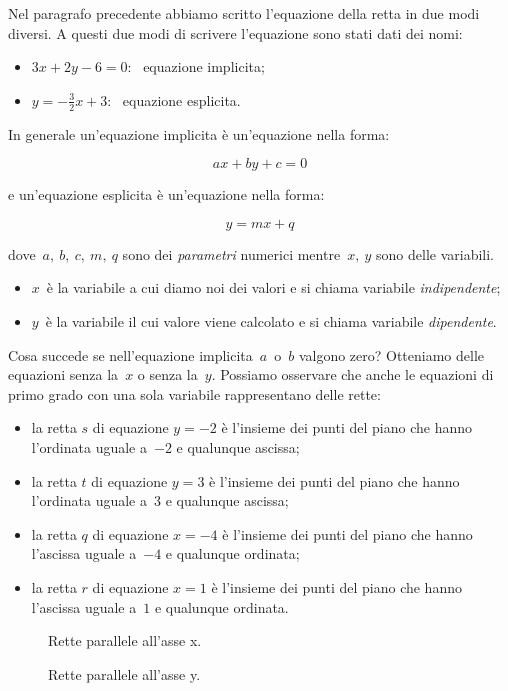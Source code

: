 Nel paragrafo precedente abbiamo scritto l'equazione della retta in due modi 
diversi. A questi due modi di scrivere l'equazione sono stati dati dei nomi:

\begin{itemize}
 \item $3x + 2y - 6 = 0$:~ equazione implicita;
 \item $y = -\frac{3}{2}x +3$:~ equazione esplicita.
\end{itemize}

In generale un'equazione implicita è un'equazione nella forma:

\[ax + by + c = 0\]

e un'equazione esplicita è un'equazione nella forma:

\[y = mx + q\]

dove~$a,~b,~c,~m,~q$ sono dei \emph{parametri} numerici mentre~$x,~y$ sono 
delle variabili.

\begin{itemize}
 \item $x$~è la variabile a cui diamo noi dei valori e si chiama 
  variabile \emph{indipendente};
 \item $y$~è la variabile il cui valore viene calcolato e si chiama 
  variabile \emph{dipendente}.
\end{itemize}

Cosa succede se nell'equazione implicita~$a$~o~$b$ valgono zero?
Otteniamo delle equazioni senza la~$x$ o senza la~$y$. 
Possiamo osservare che anche le equazioni di primo grado con una sola 
variabile rappresentano delle rette:

\begin{itemize}
 \item la retta $s$ di equazione $y=-2$ è l'insieme dei punti del piano 
  che hanno l'ordinata uguale a~$-2$ e qualunque ascissa;
 \item la retta $t$ di equazione $y=3$ è l'insieme dei punti del piano 
  che hanno l'ordinata uguale a~$3$ e qualunque ascissa;
 \item la retta $q$ di equazione $x=-4$ è l'insieme dei punti del piano 
  che hanno l'ascissa uguale a~$-4$ e qualunque ordinata;
 \item la retta $r$ di equazione $x=1$ è l'insieme dei punti del piano 
  che hanno l'ascissa uguale a~$1$ e qualunque ordinata.
\end{itemize}

\begin{inaccessibleblock}
 \begin{figure}[h]
 \centering
 \begin{minipage}[]{.50\textwidth}
  \centering
  \caption{Rette parallele all'asse x.}\label{fig:rettey}
 \end{minipage}
 \begin{minipage}[]{.40\textwidth}
  \centering
  \caption{Rette parallele all'asse y.}\label{fig:rettex}
 \end{minipage}
\end{figure}
\end{inaccessibleblock}


